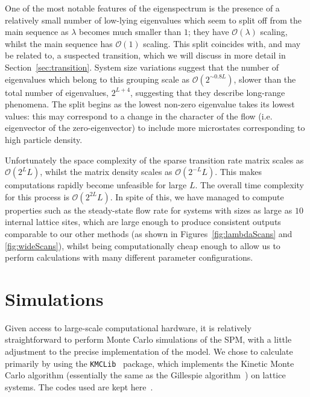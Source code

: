 \documentclass[
reprint, amsmath,amssymb, aps,
 pre, longbibliography,
]{revtex4-1}
\begin{document}
One of the most notable features of the eigenspectrum is the presence
of a relatively small number of low-lying eigenvalues which seem to
split off from the main sequence as $\lambda$ becomes much smaller
than $1$; they have $\mathcal{O}(\lambda)$ scaling, whilst the main
sequence has $\mathcal{O}(1)$ scaling. This split coincides with, and
may be related to, a suspected transition, which we will discuss in
more detail in Section~\ref{sec:transition}.  System size variations
suggest that the number of eigenvalues which belong to this grouping
scale as $\mathcal{O}(2^{\sim 0.8L})$, slower than the total number of
eigenvalues, $2^{L+4}$, suggesting that they describe long-range
phenomena.  The split begins as the lowest non-zero eigenvalue takes
its lowest values: this may correspond to a change in the character of
the flow (i.e. eigenvector of the zero-eigenvector) to include more
microstates corresponding to high particle density.



Unfortunately the space complexity of the sparse transition rate
matrix scales as $\mathcal{O}(2^L L)$, whilst the matrix density
scales as $\mathcal{O}(2^{-L} L)$.  This makes computations rapidly
become unfeasible for large $L$. The overall time complexity for this
process is $\mathcal{O}(2^{2L}L)$.  In spite of this, we have managed
to compute properties such as the steady-state flow rate for systems
with sizes as large as $10$ internal lattice sites, which are large
enough to produce consistent outputs comparable to our other methods
(as shown in Figures~\ref{fig:lambdaScans} and \ref{fig:wideScans}),
whilst being computationally cheap enough to allow us to perform
calculations with many different parameter configurations.


\section{Simulations}
\label{sec:simulations}
Given access to large-scale computational hardware, it is relatively straightforward to perform Monte Carlo simulations of the SPM, with a little adjustment to the precise implementation of the model. 
We chose to calculate primarily by using the \texttt{KMCLib}~\cite{leetmaa2014kmclib}
package, which implements the Kinetic Monte Carlo algorithm
(essentially the same as the Gillespie algorithm~\cite{Gillespie1977,
 Bortz1975, Prados1997}) on lattice systems. The codes used are kept
here~\cite{jHellGitRepo}.
\end{document}
